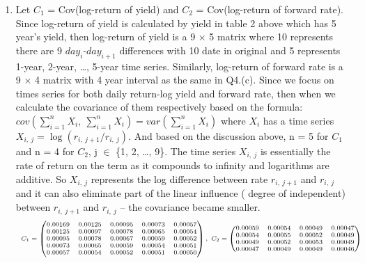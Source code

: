 \documentclass[10pt]{article}
\begin{document}
\begin{enumerate}
    \item 
        Let $C_1$  =  Cov(log-return of yield) and $C_2$ = Cov(log-return of forward rate). Since log-return of yield is calculated by yield in table 2 above which has 5 year's yield, then log-return of yield is a 9 $\times$ 5 matrix where 10 represents there are 9 $day_i$-$day_{i+1}$ differences with 10 date in original and 5 represents 1-year, 2-year, \dots, 5-year time series. Similarly, log-return of forward rate is a 9 $\times$ 4 matrix with 4 year interval as the same in Q4.(c). Since we focus on times series for both daily return-log yield and forward rate, then when we calculate the covariance of them respectively based on the formula: $cov\left( \sum_{i=1}^n X_i, \ \sum_{i=1}^n X_i \right) = var\left( \sum_{i=1}^n X_i \right)$ where $X_i$ has a time series $X_{i,\ j} = \log(r_{i, \ j+1} / r_{i, \ j})$. And based on the discussion above, n = 5 for $C_1$ and n = 4 for $C_2$, j $\in$ \{1, 2, \dots, 9\}. The time series $X_{i, \ j}$ is essentially the rate of return on the term as it compounds to infinity and logarithms are additive. So $X_{i, \ j}$ represents the log difference between rate $r_{i, \ j+1}$ and $r_{i, \ j}$ and it can also eliminate part of the linear influence ( degree of independent) between  $r_{i, \ j+1}$ and $r_{i, \ j}$ -- the covariance became smaller.
        $$
        \begin{scriptsize}
            \begin{array}{ll}
            C_1 = \begin{pmatrix}
            0.00169 & 0.00125 & 0.00095 & 0.00073 & 0.00057 \\
            0.00125 & 0.00097 & 0.00078 & 0.00065 & 0.00054 \\
            0.00095 & 0.00078 & 0.00067 & 0.00059 & 0.00052 \\
            0.00073 & 0.00065 & 0.00059 & 0.00054 & 0.00051 \\
            0.00057 & 0.00054 & 0.00052 & 0.00051 & 0.00050
            \end{pmatrix},
            \ C_2 = \begin{pmatrix}
            0.00059 & 0.00054 & 0.00049 & 0.00047 \\
            0.00054 & 0.00055 & 0.00052 & 0.00049 \\
            0.00049 & 0.00052 & 0.00053 & 0.00049 \\
            0.00047 & 0.00049 & 0.00049 & 0.00046
            \end{pmatrix}
            \end{array}

\end{scriptsize}$$
\end{enumerate}
\end{document}
